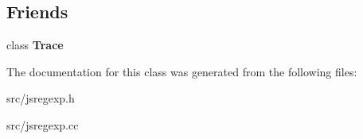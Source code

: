 \subsection*{Friends}
\begin{DoxyCompactItemize}
\item 
\hypertarget{classv8_1_1internal_1_1_out_set_a9a7aa541dbcfdac34b25b49217ec39d7}{}class {\bfseries Trace}\label{classv8_1_1internal_1_1_out_set_a9a7aa541dbcfdac34b25b49217ec39d7}

\end{DoxyCompactItemize}


The documentation for this class was generated from the following files\+:\begin{DoxyCompactItemize}
\item 
src/jsregexp.\+h\item 
src/jsregexp.\+cc\end{DoxyCompactItemize}

